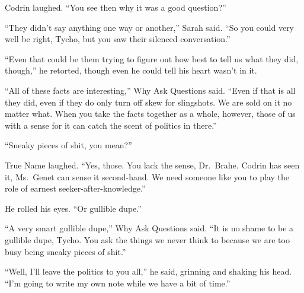 Codrin laughed. ``You see then why it was a good question?''

``They didn't say anything one way or another,'' Sarah said. ``So you could very well be right, Tycho, but you saw their silenced conversation.''

``Even that could be them trying to figure out how best to tell us what they did, though,'' he retorted, though even he could tell his heart wasn't in it.

``All of these facts are interesting,'' Why Ask Questions said. ``Even if that is all they did, even if they do only turn off skew for slingshots. We are sold on it no matter what. When you take the facts together as a whole, however, those of us with a sense for it can catch the scent of politics in there.''

``Sneaky pieces of shit, you mean?''

True Name laughed. ``Yes, those. You lack the sense, Dr.~Brahe. Codrin has seen it, Ms.~Genet can sense it second-hand. We need someone like you to play the role of earnest seeker-after-knowledge.''

He rolled his eyes. ``Or gullible dupe.''

``A very smart gullible dupe,'' Why Ask Questions said. ``It is no shame to be a gullible dupe, Tycho. You ask the things we never think to because we are too busy being sneaky pieces of shit.''

``Well, I'll leave the politics to you all,'' he said, grinning and shaking his head. ``I'm going to write my own note while we have a bit of time.''
